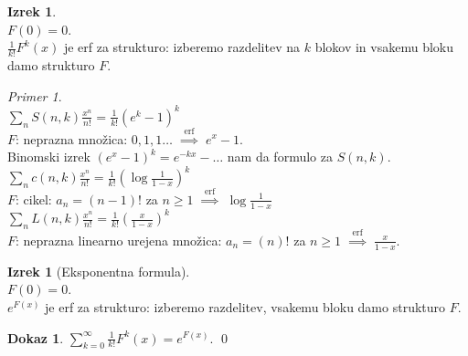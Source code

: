 \documentclass[a4paper, 12pt]{book}
\theoremstyle{definition}
\newtheorem{theorem}[counter]{Izrek}
\newtheorem{pro}[counter]{Dokaz}
\theoremstyle{remark}
\newtheorem*{ex}{Primer}
\begin{document}
\begin{theorem} \text{} \\
  $F(0) = 0$. \\
  $\frac{1}{k!} F^k(x)$ je erf za strukturo: izberemo razdelitev na $k$ blokov in vsakemu bloku damo strukturo $F$.
\end{theorem}
\begin{ex} \text{} \\
  $\sum_n S(n,k) \frac{x^n}{n!} = \frac{1}{k!} (e^k-1)^k$ \\
  $F$: neprazna množica: $0,1,1 \dots \; \stackrel{\text{erf}}{\implies} \; e^x-1$. \\
  Binomski izrek $(e^x-1)^k = e^{-kx} - \dots$ nam da formulo za $S(n,k)$. \\
  $\sum_n c(n,k) \frac{x^n}{n!} = \frac{1}{k!} \left(\log \frac{1}{1-x}\right)^k$ \\
  $F$: cikel: $a_n = (n-1)!$ za $n \geq 1 \; \stackrel{\text{erf}}{\implies} \; \log \frac{1}{1-x}$ \\
  $\sum_n L(n,k) \frac{x^n}{n!} = \frac{1}{k!} \left(\frac{x}{1-x}\right)^k$ \\
  $F$: neprazna linearno urejena množica:
  $a_n = (n)!$ za $n \geq 1 \; \stackrel{\text{erf}}{\implies} \; \frac{x}{1-x}$. \\
\end{ex}
\begin{theorem}[Eksponentna formula] \text{} \\
  $F(0) = 0$. \\
  $e^{F(x)}$ je erf za strukturo: izberemo razdelitev, vsakemu bloku damo strukturo $F$.
\end{theorem}
\begin{pro}
  $\sum_{k=0}^{\infty} \frac{1}{k!} F^k(x) = e^{F(x)}$.
  \qed
\end{pro}
\end{document}
